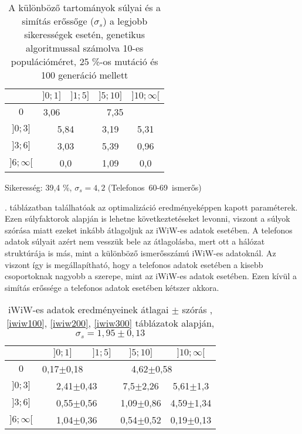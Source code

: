 \documentclass[12pt]{article}
\begin{document}
\begin{table}[H]
	\centering
	\ContinuedFloat
	\begin{subtable}{0.49\textwidth}
		\centering
		\captionsetup{justification=centering}
		\begin{tabular}{|c|c|c|c|c|}
			\hline
			\diagbox[width=1.5cm,height=1.2cm]{$\sigma_{cs}$}{$n_{cs}$} & $]0;1]$ & $]1;5]$ & $]5;10]$ & $]10;\infty[$  \\
			\hline
			$0$ & 3,06 & \multicolumn{3}{|c|}{7,35} \\
			\hline
			$]0;3]$ & \multicolumn{2}{|c|}{5,84} & 3,19 & 5,31 \\
			\hline
			$]3;6]$ & \multicolumn{2}{|c|}{3,03} & 5,39 & 0,96 \\
			\hline
			$]6;\infty[$  & \multicolumn{2}{|c|}{0,0} & 1,09 & 0,0 \\
			\hline
		\end{tabular}
		\caption{Sikeresség: 39,4 \%, $\sigma_s = 4,2$ \mbox{(Telefonos 60-69 ismerős)}}
		\label{telefon_eredmeny}
	\end{subtable}
	\caption{A különböző tartományok súlyai és a simítás erőssőge ($\sigma_s$) a legjobb sikerességek esetén, genetikus algoritmussal számolva 10-es populációméret, 25 \%-os mutáció és 100 generáció mellett} %
	\label{eredmeny_tablazat}
\end{table}
. táblázatban találhatóak az optimalizáció eredményeképpen kapott paraméterek. Ezen súlyfaktorok alapján is lehetne következtetéseket levonni, viszont a súlyok szórása miatt ezeket inkább átlagoljuk az iWiW-es adatok esetében. A telefonos adatok súlyait azért nem vesszük bele az átlagolásba, mert ott a hálózat struktúrája is más, mint a különböző ismerősszámú iWiW-es adatoknál.
Az viszont így is megállapítható, hogy a telefonos adatok esetében a kisebb csoportoknak nagyobb a szerepe, mint az iWiW-es adatok esetében. Ezen kívül a simítás erőssége a telefonos adatok esetében kétszer akkora.
\begin{table}[H]
	\centering
	\begin{tabular}{|c|c|c|c|c|}
		\hline
		\diagbox[width=1.5cm,height=1.2cm]{$\sigma_{cs}$}{$n_{cs}$} & $]0;1]$ & $]1;5]$ & $]5;10]$ & $]10;\infty[$  \\
		\hline
		$0$ & 0,17$\pm$0,18 & \multicolumn{3}{|c|}{4,62$\pm$0,58} \\
		\hline
		$]0;3]$ & \multicolumn{2}{|c|}{2,41$\pm$0,43} & 7,5$\pm$2,26 & 5,61$\pm$1,3 \\
		\hline
		$]3;6]$ & \multicolumn{2}{|c|}{0,55$\pm$0,56} & 1,09$\pm$0,86 & 4,59$\pm$1,34 \\
		\hline
		$]6;\infty[$  & \multicolumn{2}{|c|}{1,04$\pm$0,36} & 0,54$\pm$0,52 & 0,19$\pm$0,13 \\
		\hline
	\end{tabular}
	\caption{iWiW-es adatok eredményeinek átlagai $\pm$ szórás , \ref{iwiw100}, \ref{iwiw200}, \ref{iwiw300} táblázatok alapján, $\sigma_s = 1{,}95 \pm 0{,}13$}
	\label{iwiw_atlag}
\end{table}
\end{document}
